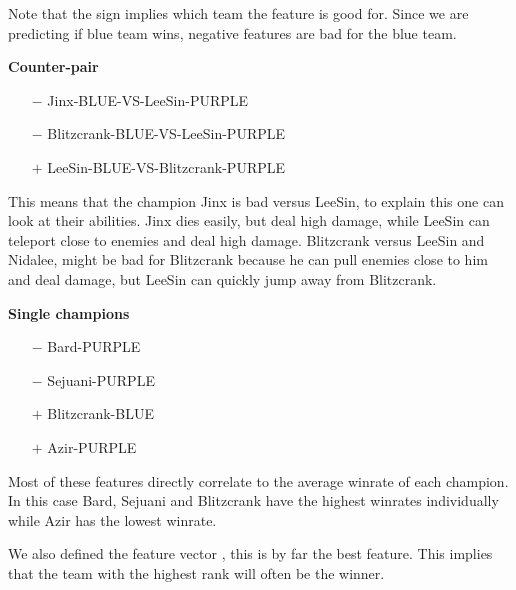 Note that the sign implies which team the feature is good for. Since we are predicting if blue team wins, negative features are bad for the blue team. 

\textbf{Counter-pair} 
\begin{itemize}
    \item[$-$] Jinx-BLUE-VS-LeeSin-PURPLE 
    \item[$-$] Blitzcrank-BLUE-VS-LeeSin-PURPLE 
    \item[$+$] LeeSin-BLUE-VS-Blitzcrank-PURPLE 
\end{itemize} 
This means that the champion Jinx is bad versus LeeSin, to explain this one can look at their abilities. Jinx dies easily, but deal high damage, while LeeSin can teleport close to enemies and deal high damage. Blitzcrank versus LeeSin and Nidalee, might be bad for Blitzcrank because he can pull enemies close to him and deal damage, but LeeSin can quickly jump away from Blitzcrank.

\textbf{Single champions} 
\begin{itemize}
    \item[$-$] Bard-PURPLE 
    \item[$-$] Sejuani-PURPLE
    \item[$+$] Blitzcrank-BLUE 
    \item[$+$] Azir-PURPLE
\end{itemize}

Most of these features directly correlate to the average winrate of each champion. In this case Bard, Sejuani and Blitzcrank have the highest winrates individually while Azir has the lowest winrate.

We also defined the feature vector , this is by far the best feature. This implies that the team with the highest rank will often be the winner.





